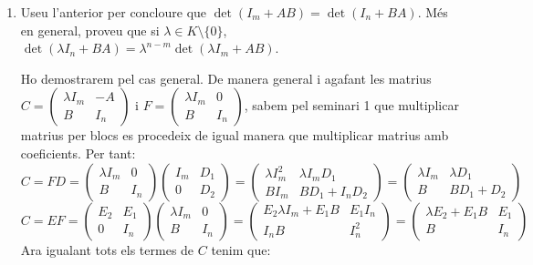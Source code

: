 \documentclass[11pt,a4paper]{article}
\begin{document}
\begin{enumerate}
   
   
    \item Useu l’anterior per concloure que $\det(I_m + AB)=\det(I_n + BA)$. Més en general, proveu que si $\lambda \in K\setminus \{0\}$, $\det(\lambda I_n+ BA)=\lambda^{n-m}\det(\lambda I_m + AB)$.\par
    Ho demostrarem pel cas general. De manera general i agafant les matrius $C=\begin{pmatrix}
   \lambda I_m & -A \\
   B & I_n
   \end{pmatrix}$ i $F=\begin{pmatrix}
   \lambda I_m & 0 \\
   B & I_n
   \end{pmatrix}$, sabem pel seminari 1 que multiplicar matrius per blocs es procedeix de igual manera que multiplicar matrius amb coeficients. Per tant: $$C=FD=\begin{pmatrix}
   \lambda I_m & 0 \\
   B & I_n
   \end{pmatrix}
   \begin{pmatrix}
   I_m & D_1 \\
   0 & D_2
   \end{pmatrix}=\begin{pmatrix}
   \lambda I_m^2 & \lambda I_mD_1 \\
   BI_m & BD_1+I_nD_2
   \end{pmatrix}=\begin{pmatrix}
   \lambda I_m & \lambda D_1 \\
   B & BD_1+D_2
   \end{pmatrix}$$
   $$C=EF=\begin{pmatrix}
   E_2 & E_1 \\
   0 & I_n
   \end{pmatrix}
   \begin{pmatrix}
   \lambda I_m & 0 \\
   B & I_n
   \end{pmatrix}=\begin{pmatrix}
   E_2\lambda I_m+E_1B & E_1I_n \\
   I_nB & I_n^2
   \end{pmatrix}=\begin{pmatrix}
   \lambda E_2+E_1B & E_1 \\
   B & I_n
   \end{pmatrix}$$
   Ara igualant tots els termes de $C$ tenim que:
   \begin{align}

\end{align}
\end{enumerate}
\end{document}
